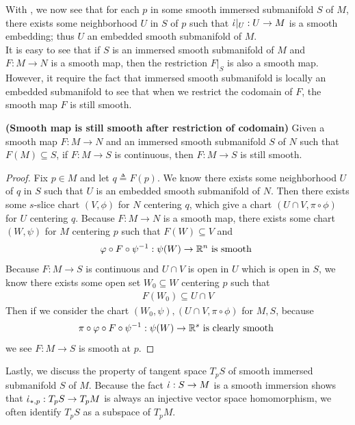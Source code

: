 \documentclass{report}
\begin{document}
\begin{mdframed}
With , we now see that for each $p$ in some smooth  immersed submanifold $S$ of  $M$, there exists some neighborhood  $U$ in $S$ of $p$ such that  $\dot{\iota} |_U:U\rightarrow M$ is a smooth embedding; thus $U$ an embedded smooth submanifold of $M$.\\

It is easy to see that if $S$ is an immersed smooth submanifold of  $M$ and  $F:M\rightarrow N$ is a smooth map, then the restriction $F|_S$ is also a smooth map. However, it require  the fact that immersed smooth submanifold is locally an embedded submanifold to see that when we restrict the codomain of $F$, the smooth map  $F$ is still smooth.  
\end{mdframed}
\begin{theorem}
\textbf{(Smooth map is still smooth after restriction of codomain)} Given a smooth map $F:M\rightarrow N$ and an immersed smooth submanifold $S$ of $N$ such that $F(M)\subseteq S$, if $F:M\rightarrow S$ is continuous, then $F:M\rightarrow S$ is still smooth.
\end{theorem}
\begin{proof}
Fix $p \in M$ and let $q\triangleq F(p)$. We know there exists some neighborhood $U$ of $q$ in  $S$ such that  $U$ is an embedded smooth submanifold of  $N$. Then there exists some  $s$-slice chart $(V,\phi)$ for $N$ centering $q$, which give a chart $(U\cap V,\pi \circ  \phi)$ for $U$ centering $q$. Because $F:M\rightarrow N$ is a smooth map, there exists some chart $(W,\psi)$ for $M$ centering  $p$ such that  $F(W)\subseteq V$ and 
\begin{align*}
\varphi \circ F \circ \psi^{-1}:\psi (W)\rightarrow \mathbb{R}^n\text{ is smooth }
\end{align*}
Because $F:M\rightarrow S$ is continuous and $U\cap V$ is open in $U$ which is open in  $S$, we know there exists some open set $W_0 \subseteq W$ centering $p$ such that 
 \begin{align*}
F(W_0)\subseteq U \cap V
\end{align*}
Then if we consider the chart  $(W_0,\psi),(U\cap V, \pi \circ \phi)$ for $M,S$, because 
 \begin{align*}
   \pi\circ \varphi \circ F \circ \psi^{-1}:\psi (W)\rightarrow \mathbb{R}^s\text{ is clearly smooth }
\end{align*}
we see $F:M\rightarrow S$ is smooth at $p$. 
\end{proof}
\begin{mdframed}
Lastly, we discuss the property of tangent space $T_pS$ of smooth immersed submanifold  $S$ of  $M$. Because the fact $\dot{\iota}:S\rightarrow M $ is a smooth immersion shows that $\dot{\iota}_{*,p}:T_pS \rightarrow T_pM$ is always an injective vector space homomorphism, we often identify $T_pS$ as a subspace of  $T_pM$. 
\end{mdframed}
\end{document}
